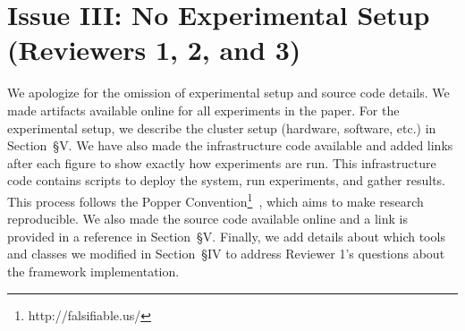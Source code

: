 \documentclass[onecolumn,conference]{IEEEtran}
\begin{document}
\section*{Issue III: No Experimental Setup (Reviewers 1, 2, and 3)}

We apologize for the omission of experimental setup and source code details.
We made artifacts available online for all experiments in the paper. For the
experimental setup, we describe the cluster setup (hardware, software, etc.) in
Section~{\S}V.  We have also made the infrastructure code available and added
links after each figure to show exactly how experiments are run.  This
infrastructure code contains scripts to deploy the system, run experiments, and
gather results.  This process follows the Popper
Convention\footnote{http://falsifiable.us/}~\cite{jimenez_popper_2016}, which
aims to make research reproducible.  We also made the source code available
online and a link is provided in a reference in Section~{\S}V. Finally, we add
details about which tools and classes we modified in Section~{\S}IV to address
Reviewer 1's questions about the framework implementation.




\end{document}
